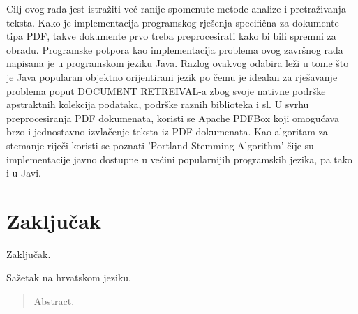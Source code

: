 \documentclass[times, utf8, zavrsni]{fer}
\begin{document}
Cilj ovog rada jest istražiti već ranije spomenute metode analize i pretraživanja teksta.	Kako je implementacija programskog rješenja specifična za dokumente tipa PDF, takve dokumente prvo treba preprocesirati kako bi bili spremni za obradu.
Programske potpora kao implementacija problema ovog završnog rada napisana je u programskom jeziku Java. Razlog ovakvog odabira leži u tome što je Java popularan objektno orijentirani jezik po čemu je idealan za rješavanje problema poput DOCUMENT RETREIVAL-a zbog svoje nativne podrške apstraktnih kolekcija podataka, podrške raznih biblioteka i sl.
U svrhu preprocesiranja PDF dokumenata, koristi se Apache PDFBox koji omogućava brzo i jednostavno izvlačenje teksta iz PDF dokumenata.
Kao algoritam za stemanje riječi koristi se poznati 'Portland Stemming Algorithm' čije su implementacije javno dostupne u većini popularnijih programskih jezika, pa tako i u Javi.

\chapter{Zaključak}
Zaključak.




\begin{sazetak}
Sažetak na hrvatskom jeziku.

\end{sazetak}

\begin{abstract}
Abstract.

\end{abstract}
\end{document}
